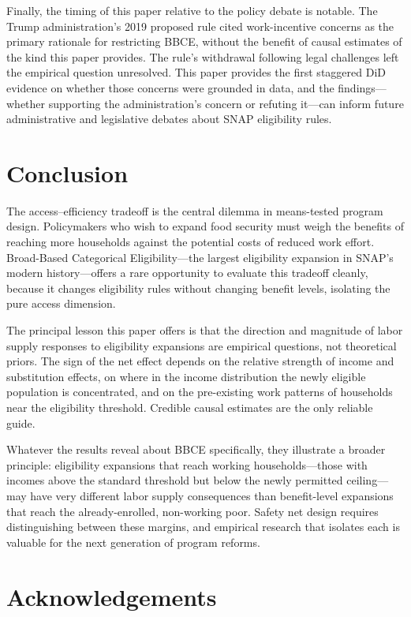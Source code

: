 \documentclass[12pt]{article}
\begin{document}
Finally, the timing of this paper relative to the policy debate is notable. The Trump administration's 2019 proposed rule cited work-incentive concerns as the primary rationale for restricting BBCE, without the benefit of causal estimates of the kind this paper provides. The rule's withdrawal following legal challenges left the empirical question unresolved. This paper provides the first staggered DiD evidence on whether those concerns were grounded in data, and the findings---whether supporting the administration's concern or refuting it---can inform future administrative and legislative debates about SNAP eligibility rules.

\section{Conclusion}

The access--efficiency tradeoff is the central dilemma in means-tested program design. Policymakers who wish to expand food security must weigh the benefits of reaching more households against the potential costs of reduced work effort. Broad-Based Categorical Eligibility---the largest eligibility expansion in SNAP's modern history---offers a rare opportunity to evaluate this tradeoff cleanly, because it changes eligibility rules without changing benefit levels, isolating the pure access dimension.

The principal lesson this paper offers is that the direction and magnitude of labor supply responses to eligibility expansions are empirical questions, not theoretical priors. The sign of the net effect depends on the relative strength of income and substitution effects, on where in the income distribution the newly eligible population is concentrated, and on the pre-existing work patterns of households near the eligibility threshold. Credible causal estimates are the only reliable guide.

Whatever the results reveal about BBCE specifically, they illustrate a broader principle: eligibility expansions that reach working households---those with incomes above the standard threshold but below the newly permitted ceiling---may have very different labor supply consequences than benefit-level expansions that reach the already-enrolled, non-working poor. Safety net design requires distinguishing between these margins, and empirical research that isolates each is valuable for the next generation of program reforms.

\section*{Acknowledgements}
\end{document}
